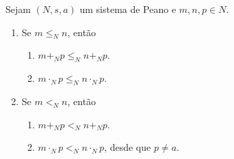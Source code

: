 \begin{proposition}
    Sejam $(N,s,a)$ um sistema de Peano e $m,n,p \in N$.
        \begin{enumerate}[leftmargin=*, align=left, label=\textbf{(\alph*)}]
            \item Se $m \leq_N n$, então
                \begin{enumerate}[label=\roman*.]
                    \item $m +_N p \leq_N n +_N p$.
                    \item $m \cdot_N p \leq_N n \cdot_N p$.
                \end{enumerate}
            \item Se $m <_N n$, então
                \begin{enumerate}[label=\roman*.]
                    \item $m +_N p <_N n +_N p$.
                    \item $m \cdot_N p <_N n \cdot_N p$, desde que $p \neq a$.
                \end{enumerate}
        \end{enumerate}
\end{proposition}

